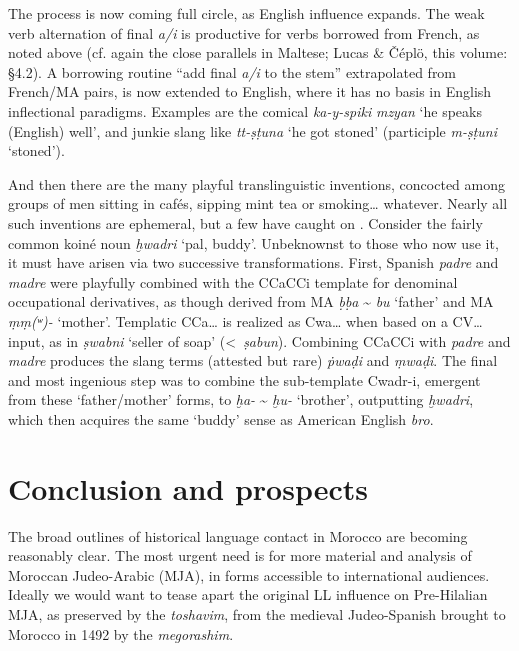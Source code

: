 \documentclass[output=paper]{langsci/langscibook}
\begin{document}
The process is now coming full circle, as English influence expands. The weak verb alternation of final \textit{a/i} is productive for verbs borrowed from French, as noted above (cf. again the close parallels in Maltese; Lucas \& Čéplö, this volume: §4.2).  A borrowing routine “add final \textit{a/i} to the stem” extrapolated from French/MA pairs, is now extended to English, where it has no basis in English inflectional paradigms. Examples are the comical \textit{ka-y-spiki} \textit{mzyan} ‘he speaks (English) well’, and junkie slang like \textit{tt-ṣṭuna} ‘he got stoned’ (participle \textit{m-ṣṭuni} ‘stoned’). 

And then there are the many playful translinguistic inventions, concocted among groups of men sitting in cafés, sipping mint tea or smoking… whatever. Nearly all such inventions are ephemeral, but a few have caught on \citep{Heath1987}. Consider the fairly common koiné noun \textit{ḫwadri} ‘pal, buddy’. Unbeknownst to those who now use it, it must have arisen via two successive transformations. First, Spanish \textit{padre} and \textit{madre} were playfully combined with the CCaCCi template for denominal occupational derivatives, as though derived from MA \textit{ḅḅa} {\textasciitilde} \textit{bu} ‘father’ and MA \textit{ṃṃ(ʷ)-} ‘mother’. Templatic CCa… is realized as Cwa… when based on a CV… input, as in \textit{ṣwabni} ‘seller of soap’ (<~\textit{ṣabun}). Combining CCaCCi with \textit{padre} and \textit{madre} produces the slang terms (attested but rare) \textit{ṗwaḍ{\R}i} and \textit{ṃwaḍ{\R}i}. The final and most ingenious step was to combine the sub-template Cwadr-i, emergent from these ‘father/mother’ forms, to \textit{ḫa-} {\textasciitilde} \textit{ḫu-} ‘brother’, outputting \textit{ḫwadri}, which then acquires the same ‘buddy’ sense as American English \textit{bro}. 

\section{Conclusion and prospects}

The broad outlines of historical language contact in Morocco are becoming reasonably clear. The most urgent need is for more material and analysis of Moroccan Judeo-Arabic (MJA), in forms accessible to international audiences. Ideally we would want to tease apart the original LL influence on Pre-Hilalian MJA, as preserved by the \textit{toshavim}, from the medieval Judeo-Spanish brought to Morocco in 1492 by the \textit{megorashim}. 
\end{document}
